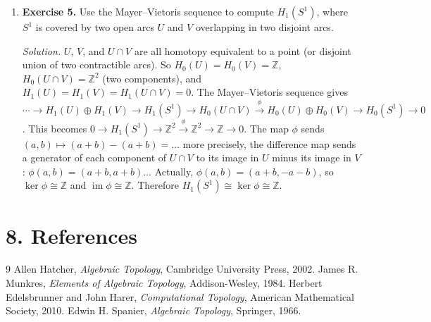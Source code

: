 \begin{enumerate}[leftmargin=*,itemsep=0.9em]
\item \textbf{Exercise 5.} Use the Mayer--Vietoris sequence to compute $H_1(S^1)$, where $S^1$ is covered by two open arcs $U$ and $V$ overlapping in two disjoint arcs.

\emph{Solution.} $U$, $V$, and $U\cap V$ are all homotopy equivalent to a point (or disjoint union of two contractible arcs). So $H_0(U)=H_0(V)=\mathbb{Z}$, $H_0(U\cap V)=\mathbb{Z}^2$ (two components), and $H_1(U)=H_1(V)=H_1(U\cap V)=0$. The Mayer--Vietoris sequence gives $\cdots\to H_1(U)\oplus H_1(V)\to H_1(S^1)\to H_0(U\cap V)\xrightarrow{\phi}H_0(U)\oplus H_0(V)\to H_0(S^1)\to 0$. This becomes $0\to H_1(S^1)\to\mathbb{Z}^2\xrightarrow{\phi}\mathbb{Z}^2\to\mathbb{Z}\to 0$. The map $\phi$ sends $(a,b)\mapsto(a+b)-(a+b)=\ldots$ more precisely, the difference map sends a generator of each component of $U\cap V$ to its image in $U$ minus its image in $V$: $\phi(a,b)=(a+b,a+b)$... Actually, $\phi(a,b)=(a+b,-a-b)$, so $\ker\phi\cong\mathbb{Z}$ and $\operatorname{im}\phi\cong\mathbb{Z}$. Therefore $H_1(S^1)\cong\ker\phi\cong\mathbb{Z}$.

\end{enumerate}
\section*{8. References}

\begin{thebibliography}{9}
 Allen Hatcher, \emph{Algebraic Topology}, Cambridge University Press, 2002.
 James R. Munkres, \emph{Elements of Algebraic Topology}, Addison-Wesley, 1984.
 Herbert Edelsbrunner and John Harer, \emph{Computational Topology}, American Mathematical Society, 2010.
 Edwin H. Spanier, \emph{Algebraic Topology}, Springer, 1966.
\end{thebibliography}
